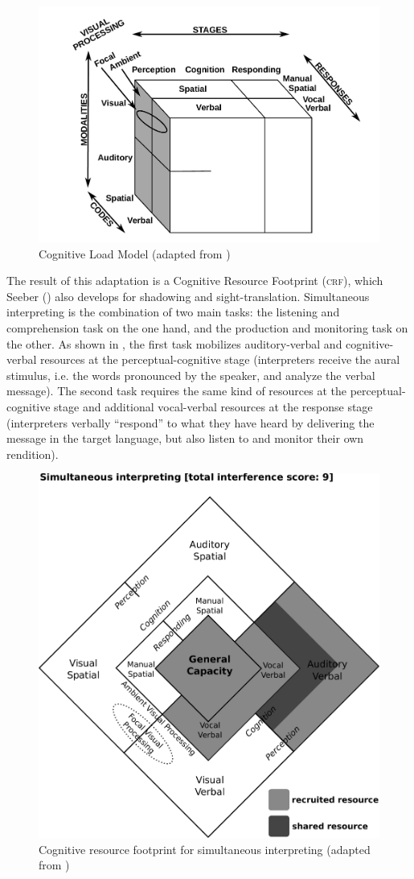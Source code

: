 \documentclass[output=paper]{langsci/langscibook}
\begin{document}
\begin{figure}
	\includegraphics[width=.7\textwidth]{figures/wickenstiescube.pdf}
\caption{Cognitive Load Model (adapted from \citealt[163]{Wickens2002})\label{fig:prandi:1}}
\end{figure}

The result of this adaptation is a Cognitive Resource Footprint (\textsc{crf}), which Seeber (\citeyear{Seeber2007}) also develops for shadowing and sight-translation. Simultaneous interpreting is the combination of two main tasks: the listening and comprehension task on the one hand, and the production and monitoring task on the other. As shown in , the first task mobilizes auditory-verbal and cognitive-verbal resources at the perceptual-cognitive stage (interpreters receive the aural stimulus, i.e. the words pronounced by the speaker, and analyze the verbal message). The second task requires the same kind of resources at the perceptual-cognitive stage and additional vocal-verbal resources at the response stage (interpreters verbally ``respond'' to what they have heard by delivering the message in the target language, but also listen to and monitor their own rendition).

\begin{figure}
	\includegraphics[width=.6\textwidth]{figures/Seeberlozenge.pdf}
	\caption{\label{fig:prandi:2}Cognitive resource footprint for simultaneous interpreting (adapted from \citealt[1385]{Seeber2007})}
\end{figure}
 
\end{document}
